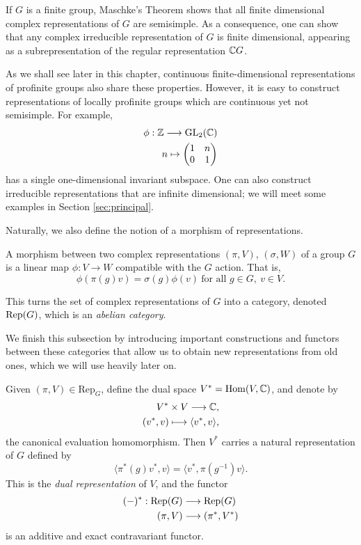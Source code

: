 \begin{rem}\label{rem_semisimple}
    If $G$ is a finite group, Maschke's Theorem shows that all finite dimensional complex representations of $G$ are semisimple. As a consequence, one can show that any complex irreducible representation of $G$ is finite dimensional, appearing as a subrepresentation of the regular representation $\mathbb{C} G$. 
    
    As we shall see later in this chapter, continuous finite-dimensional representations of profinite groups also share these properties. However, it is easy to construct representations of locally profinite groups which are continuous yet not semisimple. For example,
    \begin{align*}
        \phi:\mathbb{Z}\longrightarrow \mathrm{GL}_2(\mathbb{C})\\
        n\mapsto 
        \begin{pmatrix}
            1 & n\\
            0 & 1\\
        \end{pmatrix}
    \end{align*}
    has a single one-dimensional invariant subspace. One can also construct irreducible representations that are infinite dimensional; we will meet some examples in Section \ref{sec:principal}.
\end{rem}


Naturally, we also define the notion of a morphism of representations.

\begin{defn}
    A morphism between two complex representations $(\pi,V)$, $(\sigma,W)$ of a group $G$ is a linear map $\phi:V\rightarrow W$ compatible with the $G$ action. That is, 
    $$\phi(\pi(g)v)=\sigma(g)\phi(v)\ \text{for all } g\in G,\ v\in V.$$
\end{defn}

This turns the set of complex representations of $G$ into a category, denoted $\mathrm{Rep}(G)$, which is an \textit{abelian category}.

We finish this subsection by introducing important constructions and functors between these categories that allow us to obtain new representations from old ones, which we will use heavily later on.

\begin{defn}
    Given $(\pi,V)\in\mathrm{Rep}_G$, define the dual space $V^*=\mathrm{Hom}(V,\mathbb{C})$, and denote by 
    \begin{align*}
        V^*\times V\longrightarrow \mathbb{C},\\
        (v^*,v)\longmapsto\langle v^*,v\rangle,
    \end{align*}
    the canonical evaluation homomorphism. Then $V^*$ carries a natural representation of $G$ defined by
    $$\langle\pi^*(g)v^*,v\rangle=\langle v^*,\pi(g^{-1})v\rangle.$$
    This is the \textit{dual representation} of $V$, and the functor 
    \begin{align*}
        (-)^*:\mathrm{Rep}(G)&\longrightarrow\mathrm{Rep}(G)\\
        (\pi,V)&\longrightarrow(\pi^*,V^*)
    \end{align*}
    is an additive and exact contravariant functor.
\end{defn}

